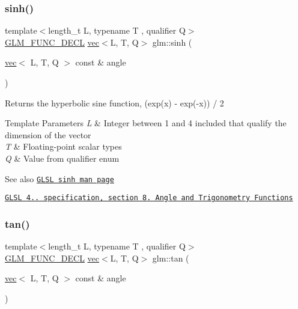 \subsubsection{\texorpdfstring{sinh()}{sinh()}}
{\footnotesize\ttfamily template$<$length\+\_\+t L, typename T , qualifier Q$>$ \\
\mbox{\hyperlink{setup_8hpp_ab2d052de21a70539923e9bcbf6e83a51}{G\+L\+M\+\_\+\+F\+U\+N\+C\+\_\+\+D\+E\+CL}} \mbox{\hyperlink{structglm_1_1vec}{vec}}$<$L, T, Q$>$ glm\+::sinh (\begin{DoxyParamCaption}\item[{\mbox{\hyperlink{structglm_1_1vec}{vec}}$<$ L, T, Q $>$ const \&}]{angle }\end{DoxyParamCaption})}

Returns the hyperbolic sine function, (exp(x) -\/ exp(-\/x)) / 2


\begin{DoxyTemplParams}{Template Parameters}
{\em L} & Integer between 1 and 4 included that qualify the dimension of the vector \\
\hline
{\em T} & Floating-\/point scalar types \\
\hline
{\em Q} & Value from qualifier enum\\
\hline
\end{DoxyTemplParams}
\begin{DoxySeeAlso}{See also}
\href{http://www.opengl.org/sdk/docs/manglsl/xhtml/sinh.xml}{\tt G\+L\+SL sinh man page} 

\href{http://www.opengl.org/registry/doc/GLSLangSpec.4.20.8.pdf}{\tt G\+L\+SL 4.. specification, section 8. Angle and Trigonometry Functions} 
\end{DoxySeeAlso}
\mbox{\label{group__core__func__trigonometric_ga293a34cfb9f0115cc606b4a97c84f11f}} 
\subsubsection{\texorpdfstring{tan()}{tan()}}
{\footnotesize\ttfamily template$<$length\+\_\+t L, typename T , qualifier Q$>$ \\
\mbox{\hyperlink{setup_8hpp_ab2d052de21a70539923e9bcbf6e83a51}{G\+L\+M\+\_\+\+F\+U\+N\+C\+\_\+\+D\+E\+CL}} \mbox{\hyperlink{structglm_1_1vec}{vec}}$<$L, T, Q$>$ glm\+::tan (\begin{DoxyParamCaption}\item[{\mbox{\hyperlink{structglm_1_1vec}{vec}}$<$ L, T, Q $>$ const \&}]{angle }\end{DoxyParamCaption})}

